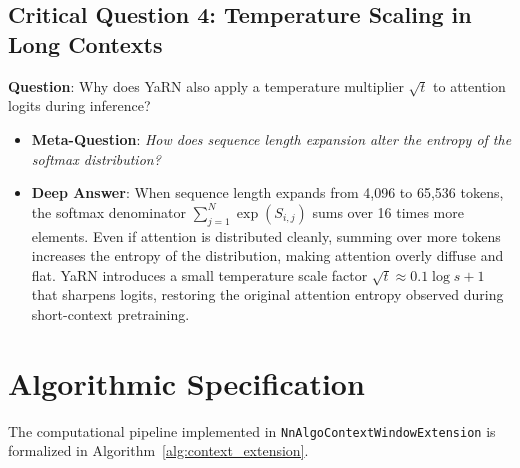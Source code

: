 \documentclass[11pt,a4paper]{article}
\theoremstyle{definition}
\begin{document}
\subsection{\textbf{Critical Question 4: Temperature Scaling in Long Contexts}}
\textbf{Question}: Why does YaRN also apply a temperature multiplier $\sqrt{t}$ to attention logits during inference?
\begin{itemize}
    \item \textbf{Meta-Question}: \emph{How does sequence length expansion alter the entropy of the softmax distribution?}
    \item \textbf{Deep Answer}: When sequence length expands from 4,096 to 65,536 tokens, the softmax denominator $\sum_{j=1}^N \exp(S_{i, j})$ sums over 16 times more elements. Even if attention is distributed cleanly, summing over more tokens increases the entropy of the distribution, making attention overly diffuse and flat. YaRN introduces a small temperature scale factor $\sqrt{t} \approx 0.1 \log s + 1$ that sharpens logits, restoring the original attention entropy observed during short-context pretraining.
\end{itemize}

\section{Algorithmic Specification}

The computational pipeline implemented in \texttt{NnAlgoContextWindowExtension} is formalized in Algorithm~\ref{alg:context_extension}.
\end{document}
